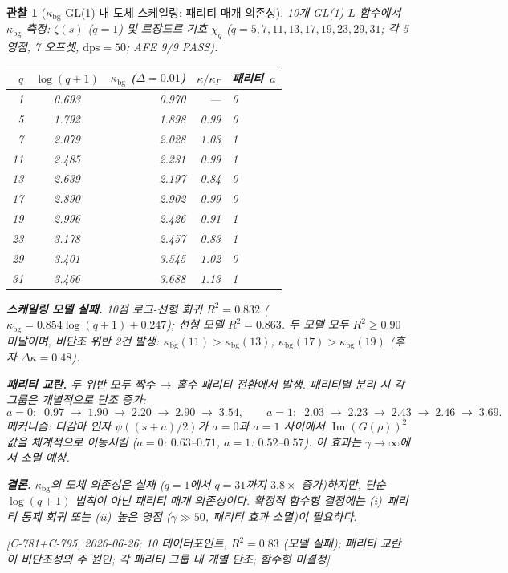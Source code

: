 \documentclass[11pt, a4paper]{article}
\theoremstyle{definition}
\theoremstyle{plain}
\newtheorem{observation}[theorem]{관찰}
\begin{document}
\begin{observation}[$\kappa_{\mathrm{bg}}$ GL(1) 내 도체 스케일링: 패리티 매개 의존성]
\label{obs:kappa_bg_conductor}
10개 GL(1) $L$-함수에서 $\kappa_{\mathrm{bg}}$ 측정:
$\zeta(s)$ ($q{=}1$) 및 르장드르 기호 $\chi_q$
($q = 5, 7, 11, 13, 17, 19, 23, 29, 31$;
각 5영점, 7 오프셋, $\mathrm{dps}{=}50$; AFE 9/9 PASS).

\smallskip
\begin{center}
\small
\begin{tabular}{@{}rcrrl@{}}
\toprule
$q$ & $\log(q{+}1)$ & $\kappa_{\mathrm{bg}}$ ($\Delta{=}0.01$)
    & $\kappa/\kappa_\Gamma$ & 패리티~$a$ \\
\midrule
 1 & 0.693 & 0.970 & ---  & 0 \\
 5 & 1.792 & 1.898 & 0.99 & 0 \\
 7 & 2.079 & 2.028 & 1.03 & 1 \\
11 & 2.485 & 2.231 & 0.99 & 1 \\
13 & 2.639 & 2.197 & 0.84 & 0 \\
17 & 2.890 & 2.902 & 0.99 & 0 \\
19 & 2.996 & 2.426 & 0.91 & 1 \\
23 & 3.178 & 2.457 & 0.83 & 1 \\
29 & 3.401 & 3.545 & 1.02 & 0 \\
31 & 3.466 & 3.688 & 1.13 & 1 \\
\bottomrule
\end{tabular}
\end{center}
\smallskip\noindent
\textbf{스케일링 모델 실패.}\;
10점 로그-선형 회귀 $R^2 = 0.832$
($\kappa_{\mathrm{bg}} = 0.854\log(q{+}1) + 0.247$);
선형 모델 $R^2 = 0.863$.
두 모델 모두 $R^2 \ge 0.90$ 미달이며,
비단조 위반 2건 발생:
$\kappa_{\mathrm{bg}}(11) > \kappa_{\mathrm{bg}}(13)$,
$\kappa_{\mathrm{bg}}(17) > \kappa_{\mathrm{bg}}(19)$
(후자 $\Delta\kappa = 0.48$).

\smallskip\noindent
\textbf{패리티 교란.}\;
두 위반 모두 \emph{짝수$\,\to\,$홀수 패리티 전환}에서 발생.
패리티별 분리 시 각 그룹은 \emph{개별적으로 단조 증가}:
\[
  a{=}0:\;\; 0.97 \;\to\; 1.90 \;\to\; 2.20 \;\to\; 2.90 \;\to\; 3.54,
  \qquad
  a{=}1:\;\; 2.03 \;\to\; 2.23 \;\to\; 2.43 \;\to\; 2.46 \;\to\; 3.69.
\]
메커니즘: 디감마 인자 $\psi((s{+}a)/2)$가 $a{=}0$과 $a{=}1$ 사이에서
$\operatorname{Im}(G(\rho))^2$ 값을 체계적으로 이동시킴
($a{=}0$: $0.63$--$0.71$, $a{=}1$: $0.52$--$0.57$).
이 효과는 $\gamma \to \infty$에서 소멸 예상.

\smallskip\noindent
\textbf{결론.}\;
$\kappa_{\mathrm{bg}}$의 도체 의존성은 실재
($q{=}1$에서 $q{=}31$까지 $3.8\times$ 증가)하지만,
단순 $\log(q{+}1)$ 법칙이 아닌 \emph{패리티 매개} 의존성이다.
확정적 함수형 결정에는
(i)~패리티 통제 회귀 또는
(ii)~높은 영점 ($\gamma \gg 50$, 패리티 효과 소멸)이 필요하다.

[C-781+C-795, 2026-06-26;
10 데이터포인트, $R^2{=}0.83$ (모델 실패);
패리티 교란이 비단조성의 주 원인;
각 패리티 그룹 내 개별 단조;
함수형 미결정]
\end{observation}
\end{document}
